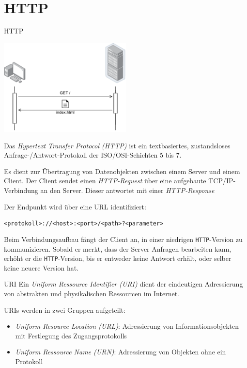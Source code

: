 \section{HTTP}

\begin{defi}{HTTP}
    \begin{center}
        \includegraphics[width=0.5\textwidth]{includes/figures/defi_http.pdf}
    \end{center}

    Das \emph{Hypertext Transfer Protocol (HTTP)} ist ein textbasiertes, zustandsloses Anfrage-/Antwort-Protokoll der ISO/OSI-Schichten 5 bis 7.

    Es dient zur Übertragung von Datenobjekten zwischen einem Server und einem Client.
    Der Client sendet einen \emph{HTTP-Request} über eine aufgebaute TCP/IP-Verbindung an den Server.
    Dieser antwortet mit einer \emph{HTTP-Response}

    Der Endpunkt wird über eine URL identifiziert:

    \centering
    \texttt{<protokoll>://<host>:<port>/<path>?<parameter>}

    Beim Verbindungsaufbau fängt der Client an, in einer niedrigen \texttt{HTTP}-Version zu kommunizieren.
    Sobald er merkt, dass der Server Anfragen bearbeiten kann, erhöht er die \texttt{HTTP}-Version, bis er entweder keine Antwort erhält, oder selber keine neuere Version hat.
\end{defi}

\begin{defi}{URI}
    Ein \emph{Uniform Ressource Identifier (URI)} dient der eindeutigen Adressierung von abstrakten und physikalischen Ressourcen im Internet.

    URIs werden in zwei Gruppen aufgeteilt:
    \begin{itemize}
        \item \emph{Uniform Resource Location (URL)}: Adressierung von Informationsobjekten mit Festlegung des Zugangsprotokolls
        \item \emph{Uniform Ressource Name (URN)}: Adressierung von Objekten ohne ein Protokoll
    \end{itemize}
\end{defi}

